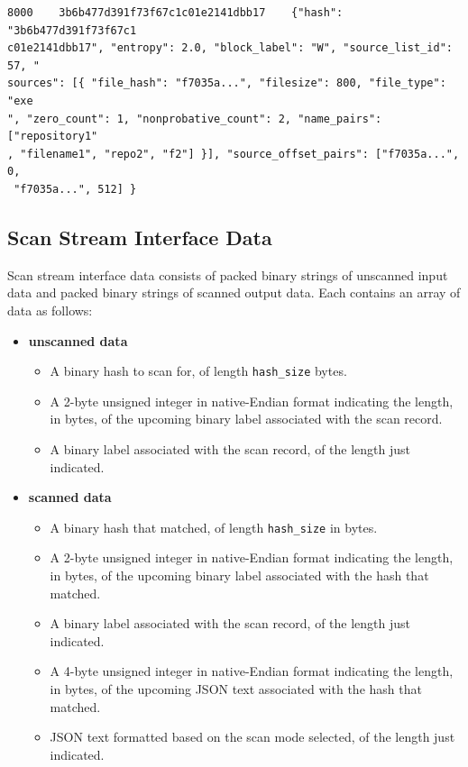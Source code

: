 \documentclass[11pt,fleqn]{article} %
\begin{document}
\lstset{style=customfile}
\begin{lstlisting}[float, caption={Example output from a scan match}, label=ScanDataWithPath]
8000	3b6b477d391f73f67c1c01e2141dbb17    {"hash": "3b6b477d391f73f67c1
c01e2141dbb17", "entropy": 2.0, "block_label": "W", "source_list_id": 57, "
sources": [{ "file_hash": "f7035a...", "filesize": 800, "file_type": "exe
", "zero_count": 1, "nonprobative_count": 2, "name_pairs": ["repository1"
, "filename1", "repo2", "f2"] }], "source_offset_pairs": ["f7035a...", 0,
 "f7035a...", 512] }
\end{lstlisting}

\subsection{Scan Stream Interface Data}
Scan stream interface data consists of packed binary strings of unscanned input data and packed binary strings of scanned output data. Each contains an array of data as follows:\\
\begin{itemize}
\item \textbf{unscanned data}
  \begin{itemize}
  \item A binary hash to scan for, of length \verb+hash_size+ bytes.
  \item A 2-byte unsigned integer in native-Endian format indicating the length, in bytes, of the upcoming binary label associated with the scan record.
  \item A binary label associated with the scan record, of the length just indicated.
  \end{itemize}
\item \textbf{scanned data}
  \begin{itemize}
  \item A binary hash that matched, of length \verb+hash_size+ in bytes.
  \item A 2-byte unsigned integer in native-Endian format indicating the length, in bytes, of the upcoming binary label associated with the hash that matched.
  \item A binary label associated with the scan record, of the length just indicated.
  \item A 4-byte unsigned integer in native-Endian format indicating the length, in bytes, of the upcoming JSON text associated with the hash that matched.
  \item JSON text formatted based on the scan mode selected, of the
length just indicated.
  \end{itemize}
\end{itemize}
\end{document}
